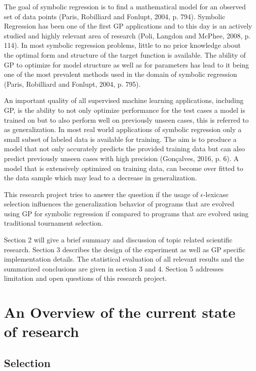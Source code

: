 \documentclass[
  12pt,
]{article}
\begin{document}
The goal of symbolic regression is to find a mathematical model for an
observed set of data points (Paris, Robilliard and Fonlupt, 2004, p.
794). Symbolic Regression has been one of the first GP applications and
to this day is an actively studied and highly relevant area of research
(Poli, Langdon and McPhee, 2008, p. 114). In most symbolic regression
problems, little to no prior knowledge about the optimal form and
structure of the target function is available. The ability of GP to
optimize for model structure as well as for parameters has lead to it
being one of the most prevalent methods used in the domain of symbolic
regression (Paris, Robilliard and Fonlupt, 2004, p. 795).

An important quality of all supervised machine learning applications,
including GP, is the ability to not only optimize performance for the
test cases a model is trained on but to also perform well on previously
unseen cases, this is referred to as generalization. In most real world
applications of symbolic regression only a small subset of labeled data
is available for training. The aim is to produce a model that not only
accurately predicts the provided training data but can also predict
previously unseen cases with high precision (Gonçalves, 2016, p. 6). A
model that is extensively optimized on training data, can become over
fitted to the data sample which may lead to a decrease in
generalization.

This research project tries to answer the question if the usage of
\(\epsilon\)-lexicase selection influences the generalization behavior
of programs that are evolved using GP for symbolic regression if
compared to programs that are evolved using traditional tournament
selection.

Section 2 will give a brief summary and discussion of topic related
scientific research. Section 3 describes the design of the experiment as
well as GP specific implementation details. The statistical evaluation
of all relevant results and the summarized conclusions are given in
section 3 and 4. Section 5 addresses limitation and open questions of
this research project.

\hypertarget{an-overview-of-the-current-state-of-research}{%
\section{An Overview of the current state of
research}\label{an-overview-of-the-current-state-of-research}}

\hypertarget{selection}{%
\subsection{Selection}\label{selection}}
\end{document}
